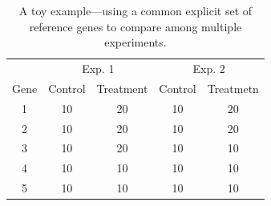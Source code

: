 \documentclass[letterpaper,12pt]{article}
\begin{document}
\begin{center}
    \begin{table}\centering
	\caption{A toy example---using a common explicit set of reference genes  to compare among multiple experiments.}\label{table:reference}
	\begin{tabular}{ccccc} \hline
	    &  \multicolumn{2}{c}{Exp. 1} & \multicolumn{2}{c}{Exp. 2} \\
	    Gene  & Control & Treatment & Control & Treatmetn \\
	    \hline
	    1     & 10       & 20       & 10    &20   \\
	    2     & 10       & 20       & 10    &20   \\
	    3     & 10       & 20       & 10    &10   \\
	    4     & 10       & 10       & 10    &10   \\ 
	    5     & 10       & 10       & 10    &10   \\  
	    \hline
	\end{tabular}
    \end{table}
\end{center}
\end{document}
